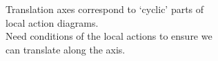 \documentclass[preview]{standalone}
\begin{document}
Translation axes correspond to `cyclic' parts of \\ local action diagrams.\\Need conditions of the local actions to ensure we \\ can translate along the axis.\\
\end{document}

